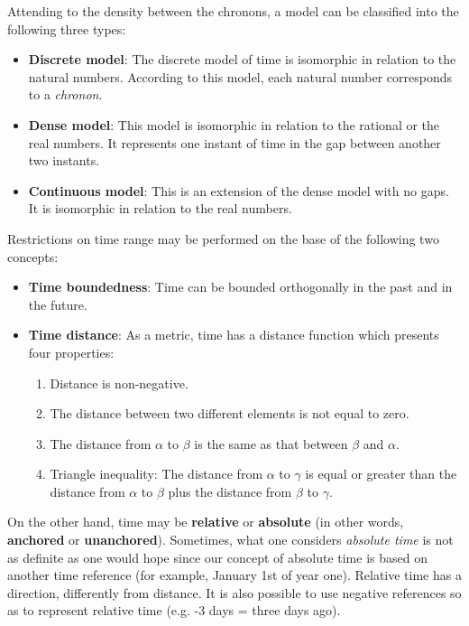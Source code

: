 Attending to the density between the chronons, a model can be classified into the following three types:

\begin{itemize}
\item
\textbf{Discrete model}:  The discrete model of time is isomorphic in relation to the natural numbers. According to this model, each natural number corresponds to a \emph{chronon}. 
\item
\textbf{Dense model}: This model is isomorphic in relation to the rational or the real numbers. It represents one instant of time in the gap between another two instants.
\item
\textbf{Continuous model}: This is an extension of the dense model with no gaps. It is isomorphic in relation to the real numbers.
\end{itemize}




Restrictions on time range may be performed on the base of the following two concepts:
\begin{itemize}
\item
\textbf{Time boundedness}: Time can be bounded orthogonally in the past and in the future.
\item
\textbf{Time distance}: As a metric, time has a distance function which presents four properties:
\begin{enumerate}
\item
Distance is non-negative.
\item
The distance between two different elements is not equal to zero.
\item
The distance from $\alpha$ to $\beta$ is the same as that between $\beta$ and $\alpha$.
\item
Triangle inequality: The distance from $\alpha$ to $\gamma$ is equal or greater than the distance from $\alpha$ to $\beta$ plus the distance from $\beta$ to $\gamma$.
\end{enumerate}
\end{itemize}

On the other hand, time may be \textbf{relative} or \textbf{absolute} (in other words, \textbf{anchored} or \textbf{unanchored}). Sometimes, what one considers \emph{absolute time} is not as definite as one would hope since our concept of absolute time is based on another time reference (for example, January 1st of year one). Relative time has a direction, differently from distance. It is also possible to use negative references so as to represent relative time (e.g. -3 days = three days ago).


